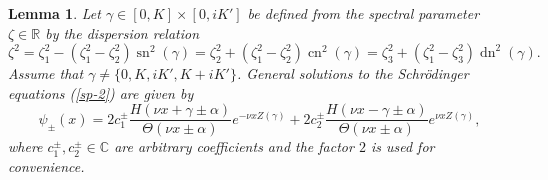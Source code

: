 \documentclass[12pt,reqno]{amsart}
\numberwithin{equation}{section}
\DeclareMathOperator{\sn}{sn}
\DeclareMathOperator{\cn}{cn}
\DeclareMathOperator{\dn}{dn}
\newtheorem{lemma}{Lemma}
\begin{document}
\begin{lemma}
	\label{lem-gamma}
	Let $\gamma \in [0,K] \times [0,iK']$ be defined from the spectral parameter $\zeta \in \mathbb{R}$ by the dispersion relation
	\begin{equation}
	\label{Lame-disp}
	\zeta^2 = \zeta_1^2 - (\zeta_1^2 - \zeta_2^2) \sn^2(\gamma) = 
	\zeta_2^2 + (\zeta_1^2 - \zeta_2^2) \cn^2(\gamma) = 
	\zeta_3^2 + (\zeta_1^2 - \zeta_3^2) \dn^2(\gamma).
	\end{equation}
	Assume that $\gamma \neq \{ 0, K, iK', K+iK'\}$.
	General solutions to the Schr\"{o}dinger equations (\ref{sp-2}) are given by 
	\begin{equation}
	\label{Lame-sol}
	\psi_{\pm}(x) = 2 c_1^{\pm} \frac{H(\nu x + \gamma \pm \alpha)}{\Theta(\nu x \pm \alpha)} e^{-\nu x Z(\gamma)} + 
	2 c_2^{\pm} \frac{H(\nu x -\gamma \pm \alpha)}{\Theta(\nu x \pm \alpha)} e^{\nu x Z(\gamma)},
	\end{equation}
	where $c_1^{\pm},c_2^{\pm} \in \mathbb{C}$ are arbitrary coefficients and the factor $2$ is used for convenience.

\end{lemma}
\end{document}
